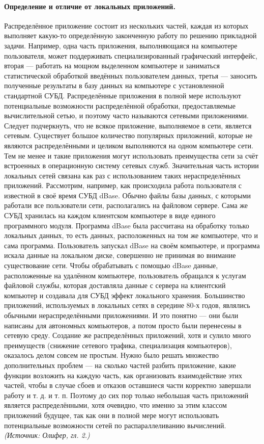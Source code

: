 \documentclass[a4paper,12pt]{article}
\begin{document}
\paragraph{Определение и отличие от локальных приложений.}
Распределённое приложение состоит из нескольких частей, каждая из которых выполняет какую-то определённую законченную работу по решению прикладной задачи. Например, одна часть приложения, выполняющаяся на компьютере пользователя, может поддерживать специализированный графический интерфейс, вторая — работать на мощном выделенном компьютере и заниматься статистической обработкой введённых пользователем данных, третья — заносить полученные результаты в базу данных на компьютере с установленной стандартной СУБД. Распределённые приложения в полной мере используют потенциальные возможности распределённой обработки, предоставляемые вычислительной сетью, и поэтому часто называются сетевыми приложениями. Следует подчеркнуть, что не всякое приложение, выполняемое в сети, является сетевым. Существует большое количество популярных приложений, которые не являются распределёнными и целиком выполняются на одном компьютере сети. Тем не менее и такие приложения могут использовать преимущества сети за счёт встроенных в операционную систему сетевых служб. Значительная часть истории локальных сетей связана как раз с использованием таких нераспределённых приложений. Рассмотрим, например, как происходила работа пользователя с известной в своё время СУБД dBase. Обычно файлы базы данных, с которыми работали все пользователи сети, располагались на файловом сервере. Сама же СУБД хранилась на каждом клиентском компьютере в виде единого программного модуля. Программа dBase была рассчитана на обработку только локальных данных, то есть данных, расположенных на том же компьютере, что и сама программа. Пользователь запускал dBase на своём компьютере, и программа искала данные на локальном диске, совершенно не принимая во внимание существование сети. Чтобы обрабатывать с помощью dBase данные, расположенные на удалённом компьютере, пользователь обращался к услугам файловой службы, которая доставляла данные с сервера на клиентский компьютер и создавала для СУБД эффект локального хранения. Большинство приложений, используемых в локальных сетях в середине 80-х годов, являлись обычными нераспределёнными приложениями. И это понятно — они были написаны для автономных компьютеров, а потом просто были перенесены в сетевую среду. Создание же распределённых приложений, хотя и сулило много преимуществ (снижение сетевого трафика, специализация компьютеров), оказалось делом совсем не простым. Нужно было решать множество дополнительных проблем — на сколько частей разбить приложение, какие функции возложить на каждую часть, как организовать взаимодействие этих частей, чтобы в случае сбоев и отказов оставшиеся части корректно завершали работу и т. д. и т. п. Поэтому до сих пор только небольшая часть приложений является распределёнными, хотя очевидно, что именно за этим классом приложений будущее, так как они в полной мере могут использовать потенциальные возможности сетей по распараллеливанию вычислений.
\textit{(Источник: Олифер, гл. 2.)}
\end{document}
